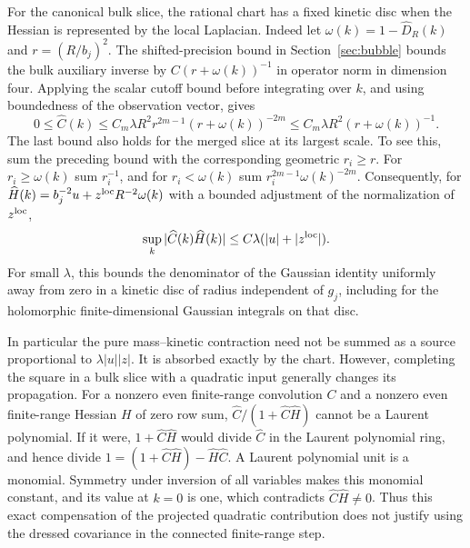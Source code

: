 \documentclass[11pt]{article}
\theoremstyle{definition}
\begin{document}
For the canonical bulk slice, the rational chart has a fixed
kinetic disc when the Hessian is represented by the local
Laplacian. Indeed let \(\omega(k)=1-\widehat D_R(k)\) and
\(r=(R/b_j)^2\). The shifted-precision bound in
Section~\ref{sec:bubble} bounds the bulk auxiliary inverse
by \(C(r+\omega(k))^{-1}\) in operator norm in dimension
four. Applying the scalar cutoff bound before integrating
over \(k\), and using boundedness of the observation
vector, gives
\begin{equation}
 0\le\widehat C(k)\le
 C_m\lambda R^2 r^{2m-1}(r+\omega(k))^{-2m}
 \le C_m\lambda R^2(r+\omega(k))^{-1}.
\end{equation}
The last bound also holds for the merged slice at its largest
scale. To see this, sum the preceding bound with the
corresponding geometric \(r_i\ge r\). For \(r_i\ge\omega(k)\)
sum \(r_i^{-1}\), and for \(r_i<\omega(k)\) sum
\(r_i^{2m-1}\omega(k)^{-2m}\).
Consequently, for
\(\widehat H(k)=b_j^{-2}u+z^{\rm loc}R^{-2}\omega(k)\)
with a bounded adjustment of the normalization of
\(z^{\rm loc}\),
\begin{equation}
 \sup_k |\widehat C(k)\widehat H(k)|
 \le C\lambda(|u|+|z^{\rm loc}|).
\end{equation}
For small \(\lambda\), this bounds the denominator of the
Gaussian identity uniformly away from zero in a kinetic disc
of radius independent of \(g_j\), including for the
holomorphic finite-dimensional Gaussian integrals on that disc.

In particular the pure mass--kinetic contraction need not be
summed as a source proportional to \(\lambda|u||z|\). It is
absorbed exactly by the chart. However, completing the square in
a bulk slice with a quadratic input generally changes its
propagation. For a nonzero even finite-range convolution \(C\)
and a nonzero even finite-range Hessian \(H\) of zero row sum,
\(\widehat C/(1+\widehat C\widehat H)\) cannot be a Laurent
polynomial. If it were, \(1+\widehat C\widehat H\) would divide
\(\widehat C\) in the Laurent polynomial ring, and hence divide
\(1=(1+\widehat C\widehat H)-\widehat H\widehat C\).
A Laurent polynomial unit is a monomial. Symmetry under
inversion of all variables makes this monomial constant, and
its value at \(k=0\) is one, which contradicts
\(\widehat C\widehat H\ne0\). Thus this exact compensation of
the projected quadratic contribution does not justify using the
dressed covariance in the connected finite-range step.
\end{document}
